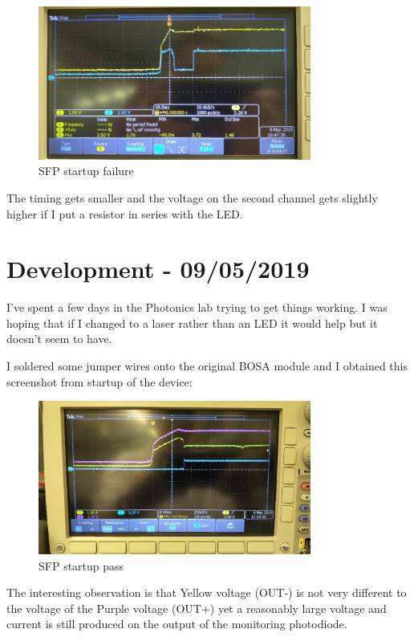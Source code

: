 \begin{figure}[H]
  \includegraphics[width=0.8\textwidth]{sfp_startup_fail.jpg}
  \caption{\ac{SFP} startup failure}
  \label{fig:sfp_startup_fail}
\end{figure}

The timing gets smaller and the voltage on the second channel gets slightly
higher if I put a resistor in series with the LED.

\section{Development - 09/05/2019}
I've spent a few days in the Photonics lab trying to get things working. I was
hoping that if I changed to a laser rather than an LED it would help but it
doesn't seem to have.

I soldered some jumper wires onto the original BOSA module and I obtained
this screenshot from startup of the device:

\begin{figure}[H]
  \includegraphics[width=0.8\textwidth]{sfp_startup_pass.jpg}
  \caption{\ac{SFP} startup pass}
  \label{fig:sfp_startup_pass}
\end{figure}

The interesting observation is that Yellow voltage (OUT-) is not very
different to the voltage of the Purple voltage (OUT+) yet a reasonably large
voltage and current is still produced on the output of the monitoring
photodiode.

